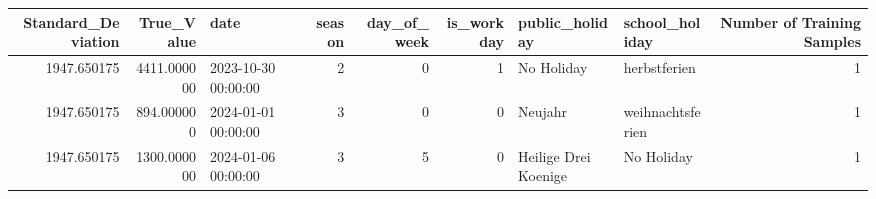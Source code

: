 \begin{tabular}{rrlrrrllr}
\toprule
Standard_Deviation & True_Value & date & season & day_of_week & is_workday & public_holiday & school_holiday & Number of Training Samples \\
\midrule
1947.650175 & 4411.000000 & 2023-10-30 00:00:00 & 2 & 0 & 1 & No Holiday & herbstferien & 1 \\
1947.650175 & 894.000000 & 2024-01-01 00:00:00 & 3 & 0 & 0 & Neujahr & weihnachtsferien & 1 \\
1947.650175 & 1300.000000 & 2024-01-06 00:00:00 & 3 & 5 & 0 & Heilige Drei Koenige & No Holiday & 1 \\
\bottomrule
\end{tabular}
